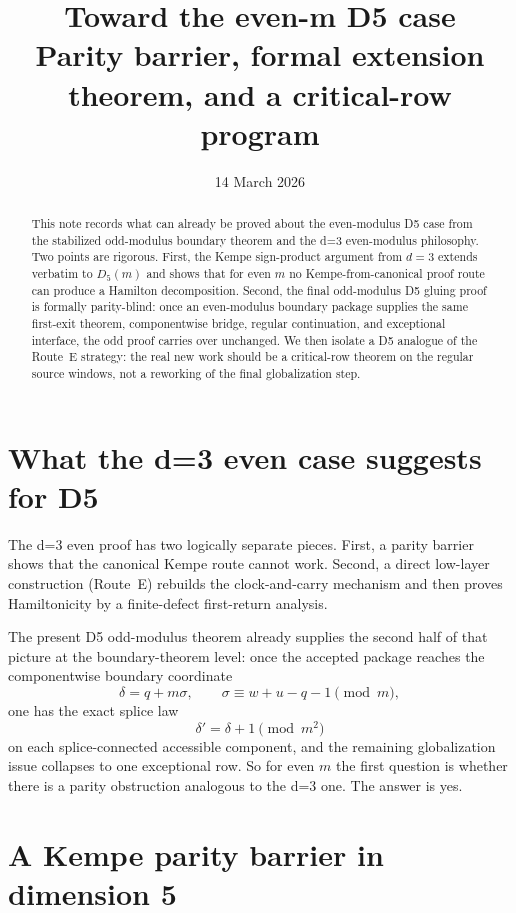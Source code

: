 \documentclass[11pt]{article}
\title{Toward the even-m D5 case\\
Parity barrier, formal extension theorem, and a critical-row program}
\author{}
\date{14 March 2026}
\begin{document}
\maketitle

\begin{abstract}
This note records what can already be proved about the even-modulus D5 case
from the stabilized odd-modulus boundary theorem and the d=3 even-modulus
philosophy. Two points are rigorous. First, the Kempe sign-product argument from
$d=3$ extends verbatim to $D_5(m)$ and shows that for even $m$ no
Kempe-from-canonical proof route can produce a Hamilton decomposition. Second,
the final odd-modulus D5 gluing proof is formally parity-blind: once an
even-modulus boundary package supplies the same first-exit theorem,
componentwise bridge, regular continuation, and exceptional interface, the odd
proof carries over unchanged. We then isolate a D5 analogue of the Route~E
strategy: the real new work should be a critical-row theorem on the regular
source windows, not a reworking of the final globalization step.
\end{abstract}

\section{What the d=3 even case suggests for D5}

The d=3 even proof has two logically separate pieces. First, a parity barrier
shows that the canonical Kempe route cannot work. Second, a direct low-layer
construction (Route~E) rebuilds the clock-and-carry mechanism and then proves
Hamiltonicity by a finite-defect first-return analysis.

The present D5 odd-modulus theorem already supplies the second half of that
picture at the boundary-theorem level: once the accepted package reaches the
componentwise boundary coordinate
\[
\delta = q + m\sigma,
\qquad
\sigma \equiv w+u-q-1 \pmod m,
\]
one has the exact splice law
\[
\delta' = \delta + 1 \pmod{m^2}
\]
on each splice-connected accessible component, and the remaining globalization
issue collapses to one exceptional row. So for even $m$ the first question is
whether there is a parity obstruction analogous to the d=3 one. The answer is
yes.

\section{A Kempe parity barrier in dimension 5}
\end{document}
